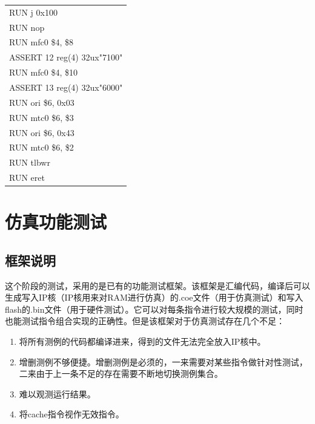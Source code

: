 \documentclass[11pt,utf8]{article}
\begin{document}
{{{{\begin{center}
\begin{longtable}{p{15cm}}
		RUN{ }j{ }0x100\\
		RUN{ }nop\\
		RUN{ }mfc0{ }\$4,{ }\$8\\
		ASSERT{ }12{ }reg(4){ }32ux"7100"\\
		RUN{ }mfc0{ }\$4,{ }\$10\\
		ASSERT{ }13{ }reg(4){ }32ux"6000"\\
		RUN{ }ori{ }\$6,{ }0x03\\
		RUN{ }mtc0{ }\$6,{ }\$3\\
		RUN{ }ori{ }\$6,{ }0x43\\
		RUN{ }mtc0{ }\$6,{ }\$2\\
		RUN{ }tlbwr\\
		RUN{ }eret\\
		\hline \end{longtable} \end{center}
}
}

}

\section{仿真功能测试} {
\subsection{框架说明} {
这个阶段的测试，采用的是已有的功能测试框架。该框架是汇编代码，编译后可以生成写入IP核（IP核用来对RAM进行仿真）的.coe文件（用于仿真测试）和写入flash的.bin文件（用于硬件测试）。它可以对每条指令进行较大规模的测试，同时也能测试指令组合实现的正确性。但是该框架对于仿真测试存在几个不足：\begin{enumerate}
	\item 将所有测例的代码都编译进来，得到的文件无法完全放入IP核中。
	\item 增删测例不够便捷。增删测例是必须的，一来需要对某些指令做针对性测试，二来由于上一条不足的存在需要不断地切换测例集合。
	\item 难以观测运行结果。
	\item 将cache指令视作无效指令。
\end{enumerate}

}}}
\end{document}
